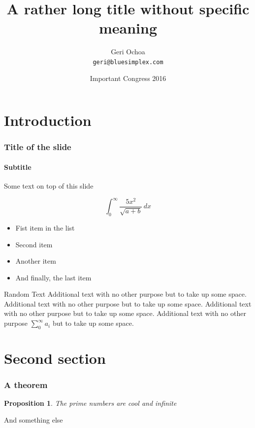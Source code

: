 \documentclass{beamer}
\title{A rather long title without specific meaning}
\author{Geri Ochoa\\ %
  \texttt{geri@bluesimplex.com}} %
\date{Important Congress 2016} %
\institute{Institute of Mathematics, Great University} %
\newtheorem{proposition}{Proposition}
\begin{document}
  \begin{frame}

    \titlepage %

  \end{frame}


  \begin{frame}
    \tableofcontents %
  \end{frame}

  \section{Introduction} %
  \begin{frame}
    \frametitle{Title of the slide}
    \framesubtitle{Subtitle} %
    Some text on top of this slide

    \[
      \int_{0}^{\infty} \frac{5x^2}{\sqrt{a+b}}\, dx
    \]

    \begin{itemize}
      \item[\checkmark] Fist item in the list %
      \item Second item
      \item Another item
      \item And finally, the last item
    \end{itemize}
  \end{frame}

  \begin{frame}{Random Text} %
    Additional text with no other purpose but to take up some space.
    Additional text with no other purpose but to take up some space.
    Additional text with no other purpose but to take up some space.
    Additional text with no other purpose 
    \( \sum_0^{\infty} a_i \) 
    but to take up some space.
  \end{frame}

  \section{Second section} %
  \begin{frame}
    \frametitle{A theorem}

    \begin{proposition} %
      The prime numbers are cool and infinite
    \end{proposition}

    And something else

  \end{frame}
\end{document}
